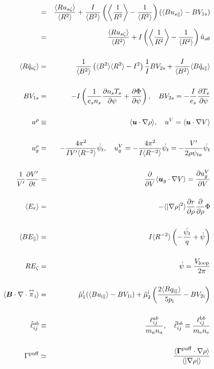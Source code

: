 \documentclass[11pt]{article}
\def\bvec#1{\leavevmode\hbox{\boldmath$#1$}}
\let\vec=\bvec
\def\r#1{{\rm#1}}
\def\ave#1{\left\langle#1\right\rangle}
\def\aves#1{\langle#1\rangle}
\def\dd#1#2{\frac{\partial #1}{\partial #2}}
\def\tensor#1{\mathord{\displaystyle\mathop{#1}^\leftrightarrow}}
\def\para{\parallel}
\def\ddrho{\frac{\partial}{\partial\rho}}
\def\psid{\dot{\psi}}
\def\psit{\psi_t}
\def\psitd{\dot{\psit}}
\def\Er{E_r}
\def\qzt#1{\hat{q}_{\r{#1}\zeta}}
\def\uszt{u_{s\zeta}}
\def\qhatpara#1{\hat{q}_{\r{#1}\para}}
\def\ugrho{u_{g}^\rho}
\def\ugV{u_{g}^V}
\def\bri{\aves{B^2}\aves{R^2} - I^2}
\def\uspara{u_{s\para}}
\begin{document}
\begin{eqnarray}
\\[2.5mm]
%
%
%
  &=& \frac{\aves{R\uszt}}{\aves{R^2}}
%
  + \frac{I}{\aves{B^2}} \left(  \ave{\frac{1}{R^2}}
			      - \frac{1}{\aves{R^2}} \right)
    (\aves{B\uspara} - BV_{1s})
\nonumber\\[2.5mm]
%
  &=& \frac{\aves{R\uszt}}{\aves{R^2}}
%
  + I \left(  \ave{\frac{1}{R^2}}
			       - \frac{1}{\aves{R^2}} \right) \hat{u}_{s\theta}
\nonumber\\[5mm]
  \ave{R \qzt{s}} &=&
%
    \frac{1}{\aves{B^2}} \left( \bri \right) \frac{1}{I} B V_{2s}
%
  + \frac{I}{\aves{B^2}} \aves{B\qhatpara{s}}
\\[5mm]
  B V_{1s} &=&
%
 - I \left( \frac{1}{e_s n_s} \dd{n_s T_s}{\psi} + \dd{\Phi}{\psi}\right),
\quad
  B V_{2s} =
%
 - \frac{I}{e_s} \dd{T_s}{\psi}
\\[5mm]
  u^\rho &\equiv&
%
  \aves{ \vec{u} \cdot \nabla\rho },
%
  \quad u^V = \aves{ \vec{u} \cdot \nabla V }
\\[5mm]
  \ugrho &=&
%
  - \frac{4\pi^2}{IV'\aves{R^{-2}}} \psitd,
%
  \quad \ugV = - \frac{4\pi^2}{I\aves{R^{-2}}} \psitd = - \frac{V'}{2\rho\psi_{ta}}\psitd
\\[5mm]
  \frac{1}{V'}\dd{V'}{t} &=&
%
  \dd{}{V}\aves{\vec{u}_g\cdot\nabla V} = \dd{u_g^V}{V}
\\[5mm]
  \aves{\Er} &=&
%
  - \aves{|\nabla\rho|^2} \dd{r}{\rho} \ddrho \Phi
\\[5mm]
  \aves{B E_\para} &=&
%
  I \aves{R^{-2}} \left( - \frac{\psitd}{q} + \psid \right)
\\[5mm]
  R E_\zeta &=&
%
  \psid
%
  = \frac{V_\r{loop}}{2\pi}
\\[5mm]
  \aves{\vec{B}\cdot\nabla\cdot\tensor{\pi}_\r{i}} &=&
%
  \hat{\mu}_1^\r{i} ( \aves{Bu_{\r{i}\para}} - BV_{1\r{i}}) 
%
  + \hat{\mu}_2^\r{i} \left( \frac{2\aves{Bq_{\r{i}\para}}}{5p_\r{i}} -
		       BV_{2\r{i}}\right)
\\[5mm]
  \hat{\ell}_{ij}^{ab} &\equiv& \frac{\ell_{ij}^{ab}}{m_an_a},
  \quad
  \hat{\ell}_{ij}^{\r{b}b} \equiv \frac{\ell_{ij}^{\r{b}b}}{m_\r{e}n_\r{e}}
\\[5mm]
  \Gamma^\r{puff} &\simeq& \frac{\aves{\vec{\Gamma}^\r{puff}\cdot\nabla\rho}}{\aves{|\nabla\rho|}}
\end{eqnarray}
\end{document}

